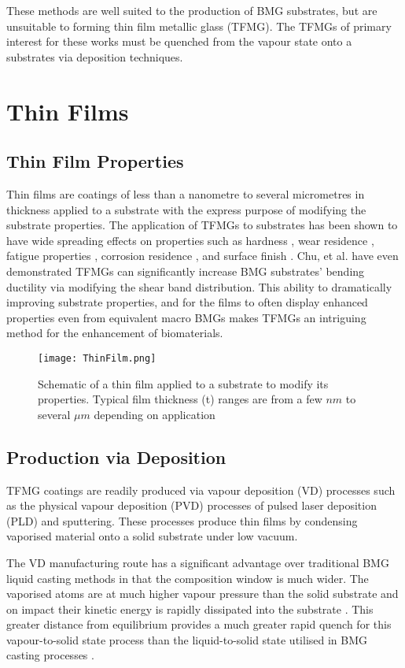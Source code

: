 \documentclass[a4paper,12pt,oneside]{report}%
\begin{document}
These methods are well suited to the production of BMG substrates, but are unsuitable to forming thin film metallic glass (TFMG). The TFMGs of primary interest for these works must be quenched from the vapour state onto a substrates via deposition techniques.

\section{Thin Films}
\subsection{Thin Film Properties}
Thin films are coatings of less than a nanometre to several micrometres in thickness applied to a substrate with the express purpose of modifying the substrate properties. The application of TFMGs to substrates has been shown to have wide spreading effects on properties such as hardness  \cite{Chu2012}, wear residence \cite{Liu2009, Prakash2005}, fatigue properties \cite{Chiang2006, Chu2011}, corrosion residence \cite{Chu2009}, and surface finish \cite{Liu2009, Chiang2006, Chu2011, Tsai2012}. Chu, et al. \cite{Chu2012} have even demonstrated TFMGs can significantly increase BMG substrates' bending ductility via modifying the shear band distribution. This ability to dramatically improving substrate properties, and for the films to often display enhanced properties even from equivalent macro BMGs makes TFMGs an intriguing method for the enhancement of biomaterials. 

\begin{figure}[htbp]
	\centering
	\texttt{[image: ThinFilm.png]}
	\caption{Schematic of a thin film applied to a substrate to modify its properties. Typical film thickness (t) ranges are from a few $nm$ to several $\mu m$ depending on application}
	\label{fig:ThinFilm}
\end{figure}

\subsection{Production via Deposition}
TFMG coatings are readily produced via vapour deposition (VD) processes such as the physical vapour deposition (PVD) processes of pulsed laser deposition (PLD) and sputtering. These processes produce thin films by condensing vaporised material onto a solid substrate under low vacuum. 

The VD manufacturing route has a significant advantage over traditional BMG liquid casting methods in that the composition window is much wider. The vaporised atoms are at much higher vapour pressure than the solid substrate and on impact their kinetic energy is rapidly dissipated into the substrate \cite{Ishii2014}. This greater distance from equilibrium provides a much greater rapid quench for this vapour-to-solid state process than the liquid-to-solid state utilised in BMG casting processes \cite{Chu2012b}. 
\end{document}
